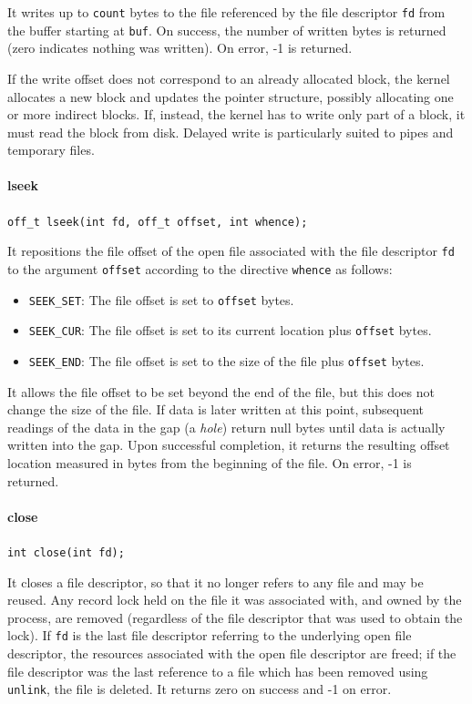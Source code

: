 It writes up to \texttt{count} bytes to the file referenced by the file descriptor \texttt{fd} from the buffer starting at \texttt{buf}. On success, the number of written bytes is returned (zero indicates nothing was written). On error, -1 is returned.

If the write offset does not correspond to an already allocated block, the kernel allocates a new block and updates the pointer structure, possibly allocating one or more indirect blocks. If, instead, the kernel has to write only part of a block, it must read the block from disk. Delayed write is particularly suited to pipes and temporary files.

\paragraph{lseek}
\texttt{off\_t lseek(int fd, off\_t offset, int whence);}

It repositions the file offset of the open file associated with the file descriptor \texttt{fd} to the argument \texttt{offset} according to the directive \texttt{whence} as follows:
\begin{itemize}
\item \texttt{SEEK\_SET}: The file offset is set to \texttt{offset} bytes.
\item \texttt{SEEK\_CUR}: The file offset is set to its current location plus \texttt{offset} bytes.
\item \texttt{SEEK\_END}: The file offset is set to the size of the file plus \texttt{offset} bytes.
\end{itemize}
It allows the file offset to be set beyond the end of the file, but this does not change the size of the file. If data is later written at this point, subsequent readings of the data in the gap (a \emph{hole}) return null bytes until data is actually written into the gap. Upon successful completion, it returns the resulting offset location measured in bytes from the beginning of the file.  On error, -1 is returned.

\paragraph{close}
\texttt{int close(int fd);}

It closes a file descriptor, so that it no longer refers to any file and may be reused. Any record lock held on the file it was associated with, and owned by the process, are removed (regardless of the file descriptor that was used to obtain the lock). If \texttt{fd} is the last file descriptor referring to the underlying open file descriptor, the resources associated with the open file descriptor are freed; if the file descriptor was the last reference to a file which has been removed using \texttt{unlink}, the file is deleted. It returns zero on success and -1 on error.

